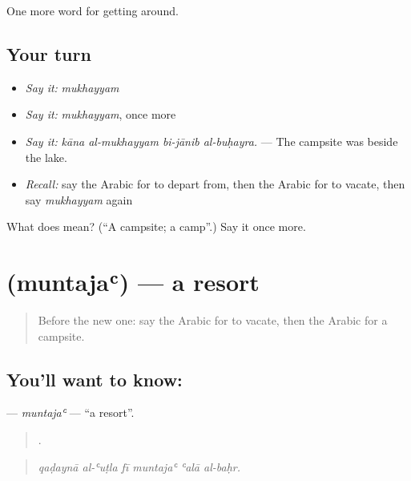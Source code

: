 \begin{grammarlens}[title={What you've built}]
One more word for getting around.
\end{grammarlens}

\subsection*{Your turn}
\begin{itemize}
\raggedright
  \item \emph{Say it:} \emph{mukhayyam}
  \item \emph{Say it:} \emph{mukhayyam}, once more
  \item \emph{Say it:} \emph{kāna al-mukhayyam bi-jānib al-buḥayra.} — The campsite was beside the lake.
  \item \emph{Recall:} say the Arabic for to depart from, then the Arabic for to vacate, then say \emph{mukhayyam} again
\end{itemize}

\begin{tcolorbox}[breakable,colback=teal!4,colframe=teal!35!black,title={Before you move on}]
What does  mean? (\textquotedblleft{}A campsite; a camp\textquotedblright{}.) Say it once more.
\end{tcolorbox}
\section[\texorpdfstring{\ar{منتجع} (muntajaʿ)}{منتجع (muntajaʿ)}]{ (muntajaʿ) — a resort}

\label{lesson:AR-C442-muntaja}



\begin{quote}
Before the new one: say the Arabic for to vacate, then the Arabic for a campsite.
\end{quote}

\subsection*{You'll want to know: }
\textbf{} — \emph{muntajaʿ} — \textquotedblleft{}a resort\textquotedblright{}.

\begin{quote}
     .
\end{quote}

\begin{quote}
\emph{qaḍaynā al-ʿuṭla fī muntajaʿ ʿalā al-baḥr.}
\end{quote}

